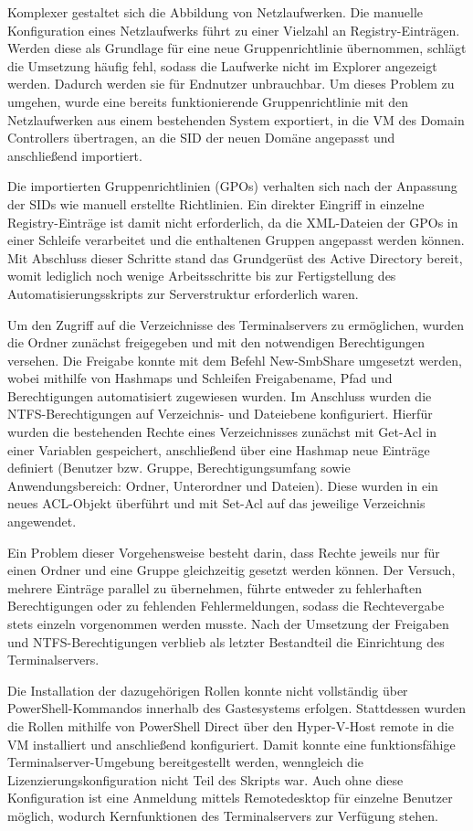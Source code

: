 \documentclass[conference]{IEEEtran}
\begin{document}
Komplexer gestaltet sich die Abbildung von Netzlaufwerken. Die manuelle Konfiguration eines Netzlaufwerks führt zu einer Vielzahl an Registry-Einträgen. Werden diese als Grundlage für eine neue Gruppenrichtlinie übernommen, schlägt die Umsetzung häufig fehl, sodass die Laufwerke nicht im Explorer angezeigt werden. Dadurch werden sie für Endnutzer unbrauchbar. Um dieses Problem zu umgehen, wurde eine bereits funktionierende Gruppenrichtlinie mit den Netzlaufwerken aus einem bestehenden System exportiert, in die VM des Domain Controllers übertragen, an die SID der neuen Domäne angepasst und anschließend importiert.

Die importierten Gruppenrichtlinien (GPOs) verhalten sich nach der Anpassung der SIDs wie manuell erstellte Richtlinien. Ein direkter Eingriff in einzelne Registry-Einträge ist damit nicht erforderlich, da die XML-Dateien der GPOs in einer Schleife verarbeitet und die enthaltenen Gruppen angepasst werden können. Mit Abschluss dieser Schritte stand das Grundgerüst des Active Directory bereit, womit lediglich noch wenige Arbeitsschritte bis zur Fertigstellung des Automatisierungsskripts zur Serverstruktur erforderlich waren.

Um den Zugriff auf die Verzeichnisse des Terminalservers zu ermöglichen, wurden die Ordner zunächst freigegeben und mit den notwendigen Berechtigungen versehen. Die Freigabe konnte mit dem Befehl New-SmbShare umgesetzt werden, wobei mithilfe von Hashmaps und Schleifen Freigabename, Pfad und Berechtigungen automatisiert zugewiesen wurden. Im Anschluss wurden die NTFS-Berechtigungen auf Verzeichnis- und Dateiebene konfiguriert. Hierfür wurden die bestehenden Rechte eines Verzeichnisses zunächst mit Get-Acl in einer Variablen gespeichert, anschließend über eine Hashmap neue Einträge definiert (Benutzer bzw. Gruppe, Berechtigungsumfang sowie Anwendungsbereich: Ordner, Unterordner und Dateien). Diese wurden in ein neues ACL-Objekt überführt und mit Set-Acl auf das jeweilige Verzeichnis angewendet.

Ein Problem dieser Vorgehensweise besteht darin, dass Rechte jeweils nur für einen Ordner und eine Gruppe gleichzeitig gesetzt werden können. Der Versuch, mehrere Einträge parallel zu übernehmen, führte entweder zu fehlerhaften Berechtigungen oder zu fehlenden Fehlermeldungen, sodass die Rechtevergabe stets einzeln vorgenommen werden musste. Nach der Umsetzung der Freigaben und NTFS-Berechtigungen verblieb als letzter Bestandteil die Einrichtung des Terminalservers.

Die Installation der dazugehörigen Rollen konnte nicht vollständig über PowerShell-Kommandos innerhalb des Gastesystems erfolgen. Stattdessen wurden die Rollen mithilfe von PowerShell Direct über den Hyper-V-Host remote in die VM installiert und anschließend konfiguriert. Damit konnte eine funktionsfähige Terminalserver-Umgebung bereitgestellt werden, wenngleich die Lizenzierungskonfiguration nicht Teil des Skripts war. Auch ohne diese Konfiguration ist eine Anmeldung mittels Remotedesktop für einzelne Benutzer möglich, wodurch Kernfunktionen des Terminalservers zur Verfügung stehen.
\end{document}
